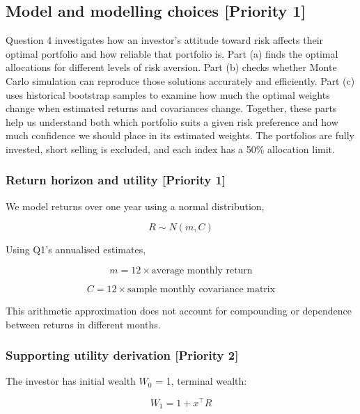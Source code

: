 \documentclass[
  10pt,
  a4paper,
]{article}
\begin{document}
\newpage

\hypertarget{model-and-modelling-choices-priority-1}{%
\subsection{Model and modelling choices {[}Priority
1{]}}\label{model-and-modelling-choices-priority-1}}

Question 4 investigates how an investor's attitude toward risk affects
their optimal portfolio and how reliable that portfolio is. Part (a)
finds the optimal allocations for different levels of risk aversion.
Part (b) checks whether Monte Carlo simulation can reproduce those
solutions accurately and efficiently. Part (c) uses historical bootstrap
samples to examine how much the optimal weights change when estimated
returns and covariances change. Together, these parts help us understand
both which portfolio suits a given risk preference and how much
confidence we should place in its estimated weights. The portfolios are
fully invested, short selling is excluded, and each index has a 50\%
allocation limit.

\hypertarget{return-horizon-and-utility-priority-1}{%
\subsubsection{Return horizon and utility {[}Priority
1{]}}\label{return-horizon-and-utility-priority-1}}

We model returns over one year using a normal distribution,

\[
R\sim N(m,C)
\]

Using Q1's annualised estimates,

\[
m=12\times\text{average monthly return}
\]

\[
C=12\times\text{sample monthly covariance matrix}
\]

This arithmetic approximation does not account for compounding or
dependence between returns in different months.

\hypertarget{supporting-utility-derivation-priority-2}{%
\subsubsection{Supporting utility derivation {[}Priority
2{]}}\label{supporting-utility-derivation-priority-2}}

The investor has initial wealth \(W_0\) = 1, terminal wealth:

\[
W_1=1+x^\top R
\]
\end{document}

